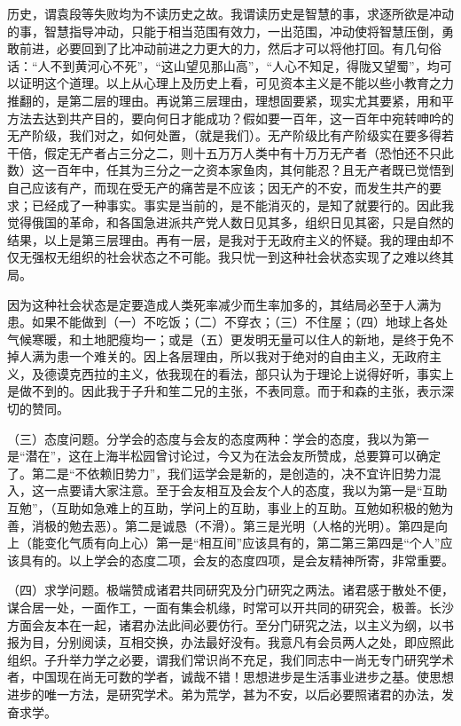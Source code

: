 历史，谓袁段等失败均为不读历史之故。我谓读历史是智慧的事，求逐所欲是冲动的事，智慧指导冲动，只能于相当范围有效力，一出范围，冲动使将智慧压倒，勇敢前进，必要回到了比冲动前进之力更大的力，然后才可以将他打回。有几句俗话：“人不到黄河心不死”，“这山望见那山高”，“人心不知足，得陇又望蜀”，均可以证明这个道理。以上从心理上及历史上看，可见资本主义是不能以些小教育之力推翻的，是第二层的理由。再说第三层理由，理想固要紧，现实尤其要紧，用和平方法去达到共产目的，要向何日才能成功？假如要一百年，这一百年中宛转呻吟的无产阶级，我们对之，如何处置，（就是我们）。无产阶级比有产阶级实在要多得若干倍，假定无产者占三分之二，则十五万万人类中有十万万无产者（恐怕还不只此数）这一百年中，任其为三分之一之资本家鱼肉，其何能忍？且无产者既已觉悟到自己应该有产，而现在受无产的痛苦是不应该；因无产的不安，而发生共产的要求；已经成了一种事实。事实是当前的，是不能消灭的，是知了就要行的。因此我觉得俄国的革命，和各国急进派共产党人数日见其多，组织日见其密，只是自然的结果，以上是第三层理由。再有一层，是我对于无政府主义的怀疑。我的理由却不仅无强权无组织的社会状态之不可能。我只忧一到这种社会状态实现了之难以终其局。

因为这种社会状态是定要造成人类死率减少而生率加多的，其结局必至于人满为患。如果不能做到（一）不吃饭；（二）不穿衣；（三）不住屋；（四）地球上各处气候寒暖，和土地肥瘦均一；或是（五）更发明无量可以住人的新地，是终于免不掉人满为患一个难关的。因上各层理由，所以我对于绝对的自由主义，无政府主义，及德谟克西拉的主义，依我现在的看法，部只认为于理论上说得好听，事实上是做不到的。因此我于子升和笙二兄的主张，不表同意。而于和森的主张，表示深切的赞同。

（三）态度问题。分学会的态度与会友的态度两种：学会的态度，我以为第一是“潜在”，这在上海半松园曾讨论过，今又为在法会友所赞成，总要算可以确定了。第二是“不依赖旧势力”，我们运学会是新的，是创造的，决不宜许旧势力混入，这一点要请大家注意。至于会友相互及会友个人的态度，我以为第一是“互助互勉”，（互助如急难上的互助，学问上的互助，事业上的互助。互勉如积极的勉为善，消极的勉去恶）。第二是诚恳（不滑）。第三是光明（人格的光明）。第四是向上（能变化气质有向上心）第一是“相互间”应该具有的，第二第三第四是“个人”应该具有的。以上学会的态度二项，会友的态度四项，是会友精神所寄，非常重要。

（四）求学问题。极端赞成诸君共同研究及分门研究之两法。诸君感于散处不便，谋合居一处，一面作工，一面有集会机缘，时常可以开共同的研究会，极善。长沙方面会友本在一起，诸君办法此间必要仿行。至分门研究之法，以主义为纲，以书报为目，分别阅读，互相交换，办法最好没有。我意凡有会员两人之处，即应照此组织。子升举力学之必要，谓我们常识尚不充足，我们同志中一尚无专门研究学术者，中国现在尚无可数的学者，诚哉不错！思想进步是生活事业进步之基。使思想进步的唯一方法，是研究学术。弟为荒学，甚为不安，以后必要照诸君的办法，发奋求学。

